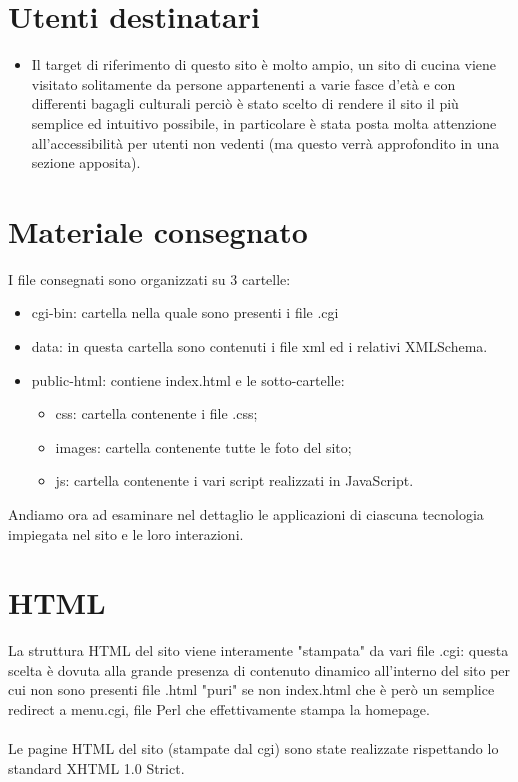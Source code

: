 \documentclass[12pt]{article}
\begin{document}
		\section{Utenti destinatari}
		\begin{itemize}
			\item Il target di riferimento di questo sito \`e molto ampio, un sito di cucina viene visitato solitamente da persone appartenenti a varie fasce d'et\`a e con differenti bagagli culturali perci\`o \`e stato scelto di rendere il sito il più semplice ed intuitivo possibile, in particolare \`e stata posta molta attenzione all'accessibilità per utenti non vedenti (ma questo verr\`a approfondito in una sezione apposita). 

		\end{itemize}
		
			\section{Materiale consegnato}
			
			 I file consegnati sono organizzati su 3 cartelle:
			\begin{itemize}
				\item cgi-bin: cartella nella quale sono presenti i file .cgi
				\item data: in questa cartella sono contenuti i file xml ed i relativi XMLSchema.
				\item public-html: contiene index.html e le sotto-cartelle:
\begin{itemize}
\item css: cartella contenente i file .css;
		\item		 images: cartella contenente tutte le foto del sito;
			\item	 js: cartella contenente i vari script realizzati in JavaScript.
\end{itemize}				 
			\end{itemize}	Andiamo ora ad esaminare nel dettaglio le applicazioni di ciascuna tecnologia impiegata nel sito e le loro interazioni. 
			\newpage
			\section{HTML}

 La struttura HTML del sito viene interamente "stampata" da vari file .cgi: questa scelta \`e dovuta alla grande presenza di contenuto dinamico all'interno del sito per cui non sono presenti file .html "puri" se non index.html che \`e per\`o un semplice redirect a menu.cgi, file Perl che effettivamente stampa la homepage. \\ \\
Le pagine HTML del sito (stampate dal cgi) sono state realizzate rispettando lo standard XHTML 1.0 Strict.
\end{document}
